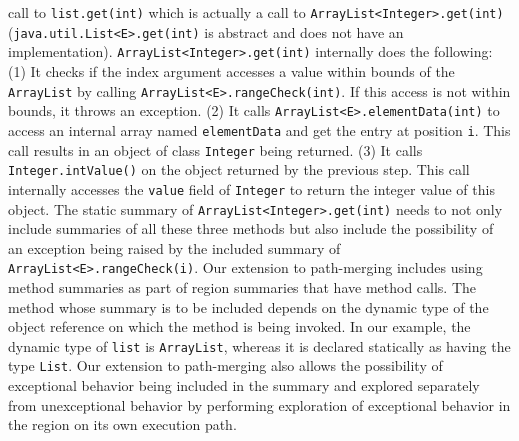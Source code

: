 call to {\tt list.get(int)} which is actually a call to {\tt ArrayList<Integer>.get(int)} ({\tt java.util.List<E>.get(int)} is abstract and does not have an implementation).
%
{\tt ArrayList<Integer>.get(int)} internally does the following:
%
(1) It checks if the index argument accesses a value within bounds of the {\tt ArrayList} by calling {\tt ArrayList<E>.rangeCheck(int)}. If this access is not within bounds, it throws an exception.
%
(2) It calls {\tt ArrayList<E>.elementData(int)} to access an internal array named {\tt elementData} and get the entry at position {\tt i}. This call results in an object of class {\tt Integer} being returned.
%
(3) It calls {\tt Integer.intValue()} on the object returned by the previous step. This call internally accesses the {\tt value} field of {\tt Integer} to return the integer value of this object.
%
The static summary of {\tt ArrayList<Integer>.get(int)} needs to not only include summaries of all these three methods but
also include the possibility of an exception being raised by the included summary of {\tt ArrayList<E>.rangeCheck(i)}.
%
Our extension to path-merging includes using method summaries as part of region summaries that have method calls.
%
The method whose summary is to be included depends on the dynamic type of the object reference on which the method is being invoked.
%
In our example, the dynamic type of {\tt list} is {\tt ArrayList}, whereas it is declared statically as having the type {\tt List}.
%
Our extension to path-merging also allows the possibility of exceptional behavior being included in the summary and
explored separately from unexceptional behavior by performing exploration of exceptional behavior in the region on its
own execution path.